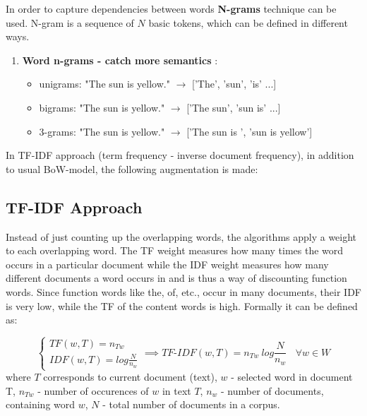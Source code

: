 In order to capture dependencies between words \textbf{N-grams} technique can be used. N-gram is a sequence of $N$ basic tokens, which can be defined in different ways. 

\begin{enumerate}
	\item \textbf{Word n-grams - catch more semantics} :
	\begin{itemize}
		\item unigrams: "The sun is yellow." $\rightarrow$ ['The', 'sun', 'is' ...]
		\item bigrams: "The sun is yellow." $\rightarrow$
		['The sun', 'sun is' ...]
		\item 3-grams: "The sun is yellow." $\rightarrow$
		['The sun is ', 'sun is yellow']
	\end{itemize}
\end{enumerate}

In TF-IDF approach (term frequency - inverse document frequency), in addition to usual BoW-model, the following augmentation is made:

\subsection{TF-IDF  Approach} \label{subsect2_1_2}
Instead of just counting up the overlapping words, the algorithms apply a weight to each overlapping word. The TF weight measures how many times the word occurs in a particular document while the IDF weight measures how many different documents a word occurs in and is thus a way of discounting function words. Since function words like the, of, etc., occur in many documents, their IDF is very low, while the TF of the content words is high.\cite[p.647]{jurafsky} Formally it can be defined as: 



\begin{equation}
\label{eq:equation2_2}
\begin{cases} TF(w,T)=n_{Tw} \\ IDF(w, T)= log{\frac{N}{n_{w}}}\end{cases} \implies
TF\text{-}IDF(w, T) = n_{Tw}\ log{\frac{N}{n_{w}}} \ \ \ \ \forall w \in W
\end{equation}
\hfill \break 
where $T$ corresponds to current document (text), \hfill \break 
$w$ - selected word in document T, \hfill \break
$n_{Tw}$ - number of occurences of $w$ in text $T$, \hfill \break
$n_{w}$ - number of documents, containing word $w$, \hfill \break
$N$ - total number of documents in a corpus.

